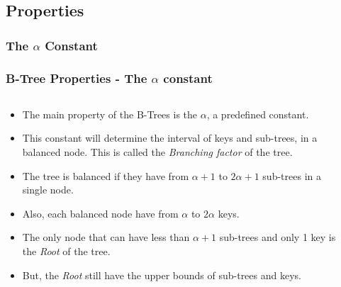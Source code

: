 \documentclass{beamer}
\begin{document}
\begin{frame}
    \subsection{Properties}
    \subsubsection{The \(\alpha\) Constant}
    \frametitle{B-Tree Properties - The \(\alpha\) constant}
    \begin{columns}
        \begin{column}{\textlecolumn}
            \begin{block}{}
                \begin{itemize}
                    \item The main property of the B-Trees is the \(\alpha\), a predefined constant.
                    \item This constant will determine the interval of keys and sub-trees, in a balanced node. This is called the \emph{Branching factor} of the tree.
                    \item The tree is balanced if they have from \(\alpha + 1\) to \(2\alpha + 1\) sub-trees in a single node.
                    \item Also, each balanced node have from \(\alpha\) to \(2\alpha\) keys.
                    \item The only node that can have less than \(\alpha + 1\) sub-trees and only 1 key is the \emph{Root} of the tree. 
                    \item But, the \emph{Root} still have the upper bounds of sub-trees and keys.
                \end{itemize}
            \end{block}
        \end{column}
        \begin{column}{\textricolumn}
        \end{column}
    \end{columns}
    
    \framebreak


\end{frame}
\end{document}
